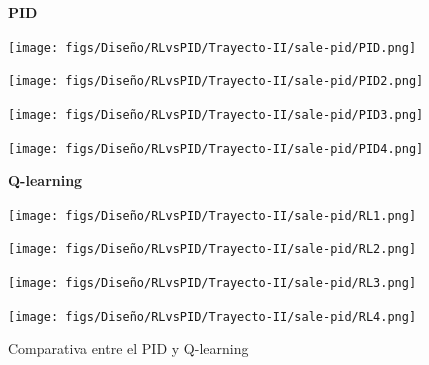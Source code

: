 \begin{figure}[H]
  \centering

  \textbf{PID}
  \vspace{0.3cm}

  \begin{minipage}[t]{0.2\textwidth}
      \centering
      \texttt{[image: figs/Diseño/RLvsPID/Trayecto-II/sale-pid/PID.png]}
      \caption*{}
  \end{minipage}
  \hfill
  \begin{minipage}[t]{0.2\textwidth}
      \centering
      \texttt{[image: figs/Diseño/RLvsPID/Trayecto-II/sale-pid/PID2.png]}
      \caption*{}
  \end{minipage}
  \hfill
  \begin{minipage}[t]{0.2\textwidth}
      \centering
      \texttt{[image: figs/Diseño/RLvsPID/Trayecto-II/sale-pid/PID3.png]}
      \caption*{}
  \end{minipage}
  \hfill
  \begin{minipage}[t]{0.2\textwidth}
      \centering
      \texttt{[image: figs/Diseño/RLvsPID/Trayecto-II/sale-pid/PID4.png]}
      \caption*{}
  \end{minipage}
  \vspace{0.5cm}

  \textbf{Q-learning}
  \vspace{0.3cm}

  \begin{minipage}[t]{0.2\textwidth}
      \centering
      \texttt{[image: figs/Diseño/RLvsPID/Trayecto-II/sale-pid/RL1.png]}
  \end{minipage}
  \hfill
  \begin{minipage}[t]{0.2\textwidth}
      \centering
      \texttt{[image: figs/Diseño/RLvsPID/Trayecto-II/sale-pid/RL2.png]}
  \end{minipage}
  \hfill
  \begin{minipage}[t]{0.2\textwidth}
      \centering
      \texttt{[image: figs/Diseño/RLvsPID/Trayecto-II/sale-pid/RL3.png]}
  \end{minipage}
  \hfill
  \begin{minipage}[t]{0.2\textwidth}
      \centering
      \texttt{[image: figs/Diseño/RLvsPID/Trayecto-II/sale-pid/RL4.png]}
  \end{minipage}
  \caption{Comparativa entre el PID y Q-learning}
  \label{comparativa-PID-qlearning}
\end{figure}


  

